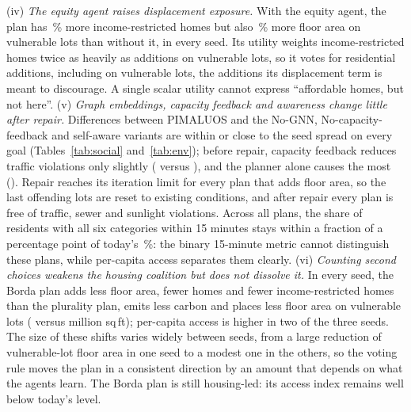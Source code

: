 \documentclass[preprint,12pt]{elsarticle}
\begin{document}
(iv) \emph{The equity agent raises displacement exposure.} With the equity agent, the plan has \PimVsNoEqAffHomesKPct{}\,\% more income-restricted homes but also \PimVsNoEqVulnMPct{}\,\% more floor area on vulnerable lots than without it, in every seed. Its utility weights income-restricted homes twice as heavily as additions on vulnerable lots, so it votes for residential additions, including on vulnerable lots, the additions its displacement term is meant to discourage. A single scalar utility cannot express ``affordable homes, but not here''.
(v) \emph{Graph embeddings, capacity feedback and awareness change little after repair.} Differences between PIMALUOS and the No-GNN, No-capacity-feedback and self-aware variants are within or close to the seed spread on every goal (Tables~\ref{tab:social} and~\ref{tab:env}); before repair, capacity feedback reduces traffic violations only slightly (\PimTrafficProp{} versus \NoCapTrafficProp{}), and the planner alone causes the most (\SingleTrafficProp{}). Repair reaches its iteration limit for every plan that adds floor area, so the last offending lots are reset to existing conditions, and after repair every plan is free of traffic, sewer and sunlight violations. Across all plans, the share of residents with all six categories within 15 minutes stays within a fraction of a percentage point of today's \BaseFullPct{}\,\%: the binary 15-minute metric cannot distinguish these plans, while per-capita access separates them clearly.
(vi) \emph{Counting second choices weakens the housing coalition but does not dissolve it.} In every seed, the Borda plan adds less floor area, fewer homes and fewer income-restricted homes than the plurality plan, emits less carbon and places less floor area on vulnerable lots (\BordaVulnMVer{} versus \PimVulnMVer{} million sq\,ft); per-capita access is higher in two of the three seeds. The size of these shifts varies widely between seeds, from a large reduction of vulnerable-lot floor area in one seed to a modest one in the others, so the voting rule moves the plan in a consistent direction by an amount that depends on what the agents learn. The Borda plan is still housing-led: its access index remains well below today's level.
\end{document}
